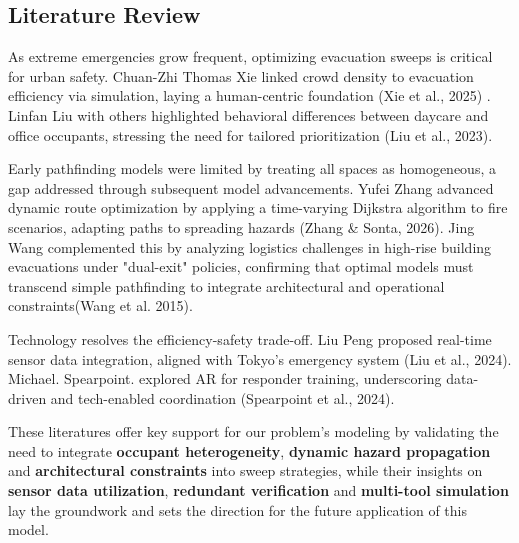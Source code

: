 \subsection{Literature Review}%

As extreme emergencies grow frequent, optimizing evacuation sweeps is critical for urban safety. Chuan-Zhi Thomas Xie linked crowd density to evacuation efficiency via simulation, laying a human-centric foundation (Xie et al., 2025) . Linfan Liu with others highlighted behavioral differences between daycare and office occupants, stressing the need for tailored prioritization (Liu et al., 2023).

Early pathfinding models were limited by treating all spaces as homogeneous, a gap addressed through subsequent model advancements. Yufei Zhang advanced dynamic route optimization by applying a time-varying Dijkstra algorithm to fire scenarios, adapting paths to spreading hazards (Zhang \& Sonta, 2026). Jing Wang complemented this by analyzing logistics challenges in high-rise building evacuations under "dual-exit" policies, confirming that optimal models must transcend simple pathfinding to integrate architectural and operational constraints(Wang et al. 2015).

Technology resolves the efficiency-safety trade-off. Liu Peng proposed real-time sensor data integration, aligned with Tokyo’s emergency system (Liu et al., 2024). Michael. Spearpoint. explored AR for responder training, underscoring data-driven and tech-enabled coordination (Spearpoint et al., 2024).

These literatures offer key support for our problem’s modeling by validating the need to integrate \textbf{occupant heterogeneity}, \textbf{dynamic hazard propagation} and \textbf{architectural constraints} into sweep strategies, while their insights on\textbf{ sensor data utilization}, \textbf{redundant verification} and \textbf{multi-tool simulation} lay the groundwork and sets the direction for the future application of this model.





